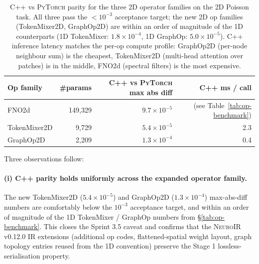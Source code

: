 \documentclass[10pt,twocolumn]{article}
\newcommand{\neuroir}{\textsc{NeuroIR}}
\newcommand{\fno}{\textsc{FNO}}
\newcommand{\py}{\textsc{PyTorch}}
\begin{document}
\begin{table}[t]
  \centering
  \small
  \begin{tabular}{lrrr}
    \toprule
    Op family    & \#params  & C{++} vs \py{} max abs diff & C{++} ms / call \\
    \midrule
    \fno{}2d       & 149{,}329 & $9.7 \times 10^{-5}$           & (see Table~\ref{tab:op-benchmark}) \\
    TokenMixer2D  &   9{,}729 & $5.4 \times 10^{-5}$           & 2.3 \\
    GraphOp2D     &   2{,}209 & $1.3 \times 10^{-4}$           & 0.4 \\
    \bottomrule
  \end{tabular}
  \caption{C++ vs \py{} parity for the three 2D operator
  families on the 2D Poisson task.  All three pass the
  $<\! 10^{-3}$ acceptance target; the new 2D op families
  (TokenMixer2D, GraphOp2D) are within an order of magnitude
  of the 1D counterparts (1D TokenMixer: $1.8 \times 10^{-4}$,
  1D GraphOp: $5.0 \times 10^{-5}$).  C{++} inference latency
  matches the per-op compute profile: GraphOp2D (per-node
  neighbour sum) is the cheapest, TokenMixer2D (multi-head
  attention over patches) is in the middle, \fno{}2d (spectral
  filters) is the most expensive.}
  \label{tab:op-benchmark-2d-cpp}
\end{table}

Three observations follow:

\paragraph{(i) C++ parity holds uniformly across the
expanded operator family.}
The new TokenMixer2D ($5.4 \times 10^{-5}$) and GraphOp2D
($1.3 \times 10^{-4}$) max-abs-diff numbers are comfortably
below the $10^{-3}$ acceptance target, and within an order
of magnitude of the 1D TokenMixer / GraphOp numbers from
\S\ref{tab:op-benchmark}.  This closes the Sprint 3.5
caveat and confirms that the \neuroir{} v0.12.0 IR extensions
(additional op codes, flattened-spatial weight layout,
graph topology entries reused from the 1D convention)
preserve the Stage 1 lossless-serialisation property.
\end{document}

